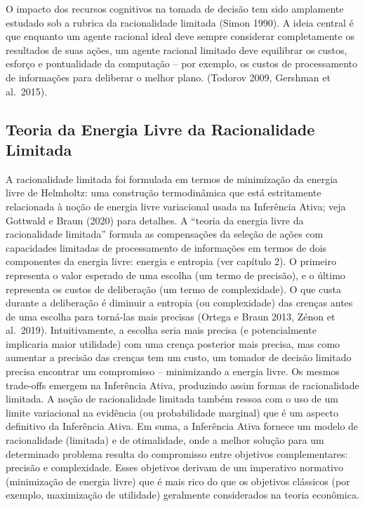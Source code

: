 \documentclass[
  12pt,
]{book}
\begin{document}
O impacto dos recursos cognitivos na tomada de decisão tem sido amplamente estudado sob a rubrica da racionalidade limitada (Simon 1990). A ideia central é que enquanto um agente racional ideal deve sempre considerar completamente os resultados de suas ações, um agente racional limitado deve equilibrar os custos, esforço e pontualidade da computação -- por exemplo, os custos de processamento de informações para deliberar o melhor plano. (Todorov 2009, Gershman et al.~2015).

\hypertarget{teoria-da-energia-livre-da-racionalidade-limitada}{%
\subsection{Teoria da Energia Livre da Racionalidade Limitada}\label{teoria-da-energia-livre-da-racionalidade-limitada}}

A racionalidade limitada foi formulada em termos de minimização da energia livre de Helmholtz: uma construção termodinâmica que está estritamente relacionada à noção de energia livre variacional usada na Inferência Ativa; veja Gottwald e Braun (2020) para detalhes. A ``teoria da energia livre da racionalidade limitada'' formula as compensações da seleção de ações com capacidades limitadas de processamento de informações em termos de dois componentes da energia livre: energia e entropia (ver capítulo 2). O primeiro representa o valor esperado de uma escolha (um termo de precisão), e o último representa os custos de deliberação (um termo de complexidade). O que custa durante a deliberação é diminuir a entropia (ou complexidade) das crenças antes de uma escolha para torná-las mais precisas (Ortega e Braun 2013, Zénon et al.~2019). Intuitivamente, a escolha seria mais precisa (e potencialmente implicaria maior utilidade) com uma crença posterior mais precisa, mas como aumentar a precisão das crenças tem um custo, um tomador de decisão limitado precisa encontrar um compromisso -- minimizando a energia livre. Os mesmos trade-offs emergem na Inferência Ativa, produzindo assim formas de racionalidade limitada. A noção de racionalidade limitada também ressoa com o uso de um limite variacional na evidência (ou probabilidade marginal) que é um aspecto definitivo da Inferência Ativa. Em suma, a Inferência Ativa fornece um modelo de racionalidade (limitada) e de otimalidade, onde a melhor solução para um determinado problema resulta do compromisso entre objetivos complementares: precisão e complexidade. Esses objetivos derivam de um imperativo normativo (minimização de energia livre) que é mais rico do que os objetivos clássicos (por exemplo, maximização de utilidade) geralmente considerados na teoria econômica.
\end{document}

